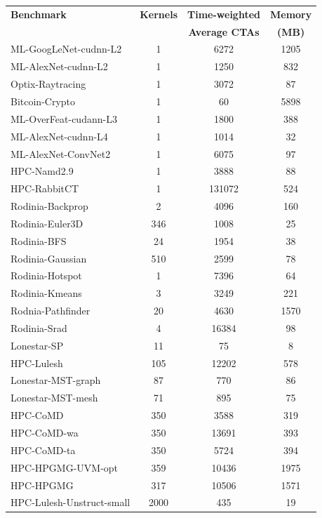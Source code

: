 \begin{table}[t]
\begin{small}
\centering
\begin{tabular}{lccc}
 \toprule
 \textbf{Benchmark} & \textbf{Kernels} & \textbf{Time-weighted} & \textbf{Memory} \\
& & \textbf{Average CTAs} & \textbf{(MB)} \\
 \toprule
ML-GoogLeNet-cudnn-L2 & 1 & 6272 & 1205 \\
ML-AlexNet-cudnn-L2 & 1 & 1250 & 832 \\
Optix-Raytracing & 1 & 3072 & 87 \\
Bitcoin-Crypto & 1 & 60 & 5898 \\
ML-OverFeat-cudann-L3 & 1 & 1800 & 388 \\
ML-AlexNet-cudnn-L4 & 1 & 1014 & 32 \\
ML-AlexNet-ConvNet2 & 1 & 6075 & 97 \\
HPC-Namd2.9 & 1 & 3888 & 88 \\
HPC-RabbitCT & 1 & 131072 & 524 \\
Rodinia-Backprop & 2 & 4096 & 160 \\
Rodinia-Euler3D & 346 & 1008 & 25 \\
Rodinia-BFS & 24 & 1954 & 38 \\
Rodinia-Gaussian & 510 & 2599 & 78 \\
Rodinia-Hotspot & 1 & 7396 & 64 \\
Rodinia-Kmeans & 3 & 3249 & 221 \\
Rodnia-Pathfinder & 20 & 4630 & 1570 \\
Rodinia-Srad & 4 & 16384 & 98 \\
Lonestar-SP & 11 & 75 & 8 \\
HPC-Lulesh & 105 & 12202 & 578 \\
Lonestar-MST-graph & 87 & 770 & 86 \\
Lonestar-MST-mesh & 71 & 895 & 75 \\
HPC-CoMD & 350 & 3588 & 319 \\
HPC-CoMD-wa & 350 & 13691 & 393 \\
HPC-CoMD-ta & 350 & 5724 & 394 \\
HPC-HPGMG-UVM-opt & 359 & 10436 & 1975 \\
HPC-HPGMG & 317 & 10506 & 1571 \\
HPC-Lulesh-Unstruct-small & 2000 & 435 & 19 \\

\end{tabular}
\end{small}
\end{table}
